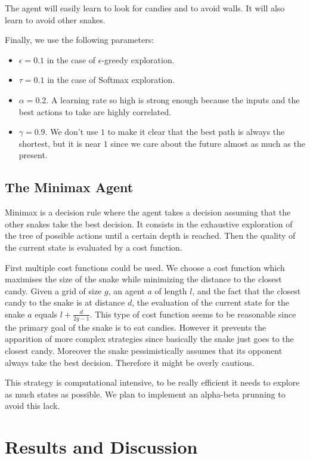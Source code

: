 \documentclass[journal, a4paper]{IEEEtran}
\begin{document}
The agent will easily learn to look for candies and to avoid walls.
It will also learn to avoid other snakes.

Finally, we use the following parameters:
\begin{itemize}
    \item $\epsilon = 0.1$ in the case of $\epsilon$-greedy exploration.
    \item $\tau = 0.1$ in the case of Softmax exploration.
    \item $\alpha = 0.2$. A learning rate so high is strong enough because the inputs and the best actions to take are highly correlated.
    \item $\gamma = 0.9$. We don't use $1$ to make it clear that the best path is always the shortest, but it is near $1$ since we care about the future almost as much as the present.
\end{itemize}

\subsection{The Minimax Agent}
Minimax is a decision rule where the agent takes a decision assuming that the other snakes take the best decision. It consists in the exhaustive exploration of the tree of possible actions until a certain depth is reached. Then the quality of the current state is evaluated by a cost function. 

First multiple cost functions could be used. We choose a cost function which maximises the size of the snake while minimizing the distance to the closest candy. Given a grid of size $g$, an agent $a$ of length $l$, and the fact that the closest candy to the snake is at distance $d$, the evaluation of the current state for the snake $a$ equals $l+\tfrac{d}{2g-1}$. This type of cost function seems to be reasonable since the primary goal of the snake is to eat candies. However it prevents the apparition of more complex strategies since basically the snake just goes to the closest candy. Moreover the snake pessimistically assumes that its opponent always take the best decision. Therefore it might be overly cautious.

This strategy is computational intensive, to be really efficient it needs to explore as much states as possible. We plan to implement an alpha-beta prunning to avoid this lack. 

\section{Results and Discussion}
\end{document}

